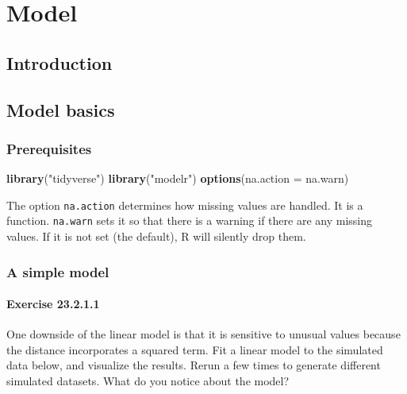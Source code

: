 \documentclass[]{book}
\newenvironment{Shaded}{\begin{snugshade}}{\end{snugshade}}
\newcommand{\DataTypeTok}[1]{\textcolor[rgb]{0.13,0.29,0.53}{#1}}
\newcommand{\KeywordTok}[1]{\textcolor[rgb]{0.13,0.29,0.53}{\textbf{#1}}}
\newcommand{\NormalTok}[1]{#1}
\newcommand{\StringTok}[1]{\textcolor[rgb]{0.31,0.60,0.02}{#1}}
\theoremstyle{plain}
\theoremstyle{remark}
\begin{document}
\hypertarget{part-model}{%
\part{Model}\label{part-model}}

\hypertarget{model-intro}{%
\chapter{Introduction}\label{model-intro}}

\hypertarget{model-basics}{%
\chapter{Model basics}\label{model-basics}}

\hypertarget{prerequisites-1}{%
\section{Prerequisites}\label{prerequisites-1}}

\begin{Shaded}
\begin{Highlighting}[]
\KeywordTok{library}\NormalTok{(}\StringTok{"tidyverse"}\NormalTok{)}
\KeywordTok{library}\NormalTok{(}\StringTok{"modelr"}\NormalTok{)}
\KeywordTok{options}\NormalTok{(}\DataTypeTok{na.action =}\NormalTok{ na.warn)}
\end{Highlighting}
\end{Shaded}

The option \texttt{na.action} determines how missing values are handled.
It is a function.
\texttt{na.warn} sets it so that there is a warning if there are any missing values.
If it is not set (the default), R will silently drop them.

\hypertarget{a-simple-model}{%
\section{A simple model}\label{a-simple-model}}

\hypertarget{exercise-23.2.1.1}{%
\subsection*{\texorpdfstring{Exercise {23.2.1.1}}{Exercise 23.2.1.1}}\label{exercise-23.2.1.1}}

One downside of the linear model is that it is sensitive to unusual values because the distance incorporates a squared term. Fit a linear model to the simulated data below, and visualize the results. Rerun a few times to generate different simulated datasets. What do you notice about the model?
\end{document}
